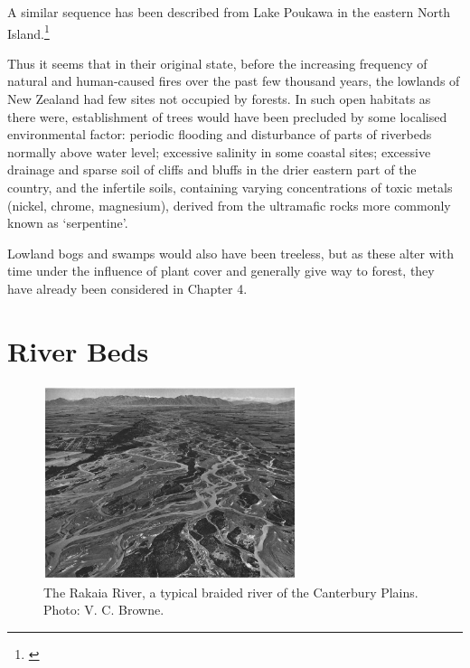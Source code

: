 A similar sequence has been described from Lake Poukawa in the eastern North Island.\footnote{\cite{mcglone1978forest}}

Thus it seems that in their original state, before the increasing frequency of natural and human-caused fires over the past few thousand years, the lowlands of New Zealand had few sites not occupied by forests.
In such open habitats as there were, establishment of trees would have been precluded by some localised environmental factor: periodic flooding and disturbance of parts of riverbeds normally above water level; excessive salinity in some coastal sites; excessive drainage and sparse soil of cliffs and bluffs in the drier eastern part of the country, and the infertile soils, containing varying concentrations of toxic metals (nickel, chrome, magnesium), derived from the ultramafic rocks more commonly known as `serpentine'.

Lowland bogs and swamps would also have been treeless, but as these alter with time under the influence of plant cover and generally give way to forest, they have already been considered in Chapter 4.

\section{River Beds}

\begin{figure}
	\includegraphics[width=0.66\textwidth]{graphics/figure87rakaia.jpg}
	\centering
	\caption[The Rakaia River]{The Rakaia River, a typical braided river of the Canterbury Plains.
	Photo: V. C. Browne.}%
	\label{fig:87rakaia}
\end{figure}

